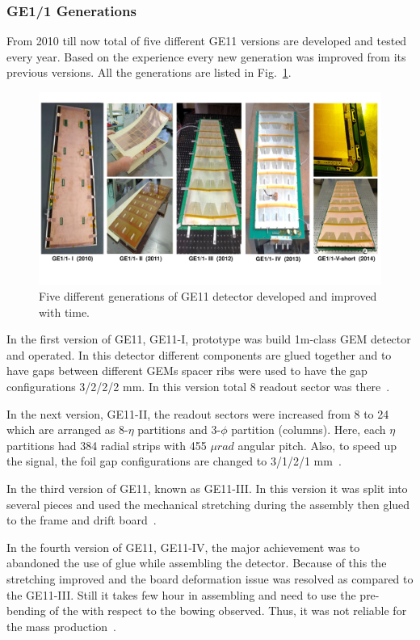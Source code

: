 \subsubsection{GE1/1 Generations} %
\label{ssub:ge1_1_generations}
From 2010 till now total of five different GE11 versions are developed and tested every year. Based on the experience every new generation was improved from its previous versions. All the generations are listed in Fig.~\ref{fig:GE11generations}.
\begin{figure}[!htbp]
    \centering
    \includegraphics[width=1.0\textwidth]{figures/GEM/5-prototype-generations.pdf}
    \caption{Five different generations of GE11 detector developed and improved with time.}
    \label{fig:GE11generations}
\end{figure}

In the first version of GE11, GE11-I, prototype was build 1m-class GEM detector and operated. In this detector different components are glued together and to have gaps between different GEMs spacer ribs were used to have the gap configurations 3/2/2/2 mm. In this version total 8 readout sector was there~\cite{Abbaneo2010}.

In the next version, GE11-II, the readout sectors were increased from 8 to 24 which are arranged as 8-$\eta$ partitions and 3-$\phi$ partition (columns). Here, each $\eta$ partitions had 384 radial strips with 455 $\mu rad$ angular pitch. Also, to speed up the signal, the foil gap configurations are changed to 3/1/2/1 mm~\cite{Abbaneo2011}.

In the third version of GE11, known as GE11-III. In this version it was split into several pieces and used the mechanical stretching during the assembly then glued to the frame and drift board~\cite{Abbaneoo2012}.

In the fourth version of GE11, GE11-IV, the major achievement was to abandoned the use of glue while assembling the detector. Because of this the stretching improved and the board deformation issue was resolved as compared to the GE11-III. Still it takes few hour in assembling and need to use the pre-bending of the with respect to the bowing observed. Thus, it was not reliable for the mass production~\cite{Abbaneo2013}. 

